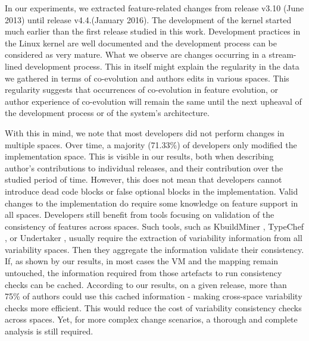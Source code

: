 In our experiments, we extracted feature-related changes from release v3.10 (June 2013) until release v4.4.(January 2016).
The development of the kernel started much earlier than the first release studied in this work.
Development practices in the Linux kernel are well documented and the development process can be considered as very mature.
What we observe are changes occurring in a stream-lined development process.
This in itself might explain the regularity in the data we gathered in terms of co-evolution and authors edits in various spaces.
This regularity suggests that occurrences of co-evolution in feature evolution, or author experience of co-evolution
will remain the same until the next upheaval of the development process or of the system's architecture.

With this in mind, we note that most developers did not perform changes in multiple spaces.
Over time, a majority (71.33\%) of developers only modified the implementation space.
This is visible in our results, both when describing author's contributions to individual releases, and their contribution over the studied period of time.
However, this does not mean that developers cannot introduce dead code blocks or false optional blocks in the implementation.
Valid changes to the implementation do require some knowledge on feature support in all spaces.
Developers still benefit from tools focusing on validation of the consistency of features across spaces.
Such tools, such as KbuildMiner \citep{nadi_mining_2012}, TypeChef \citep{kenner_typechef:_2010}, or Undertaker \citep{tartler_dead_2009}, usually 
require the extraction of variability information from all variability spaces. 
Then they aggregate the information validate their consistency.
If, as shown by our results, in most cases the VM and the mapping remain untouched, the information required from those artefacts
to run consistency checks can be cached. 
According to our results, on a given release, more than 75\% of authors could use this cached information - making 
cross-space variability checks more efficient.
This would reduce the cost of variability consistency checks across spaces.
Yet, for more complex change scenarios, a thorough and complete analysis is still required.

